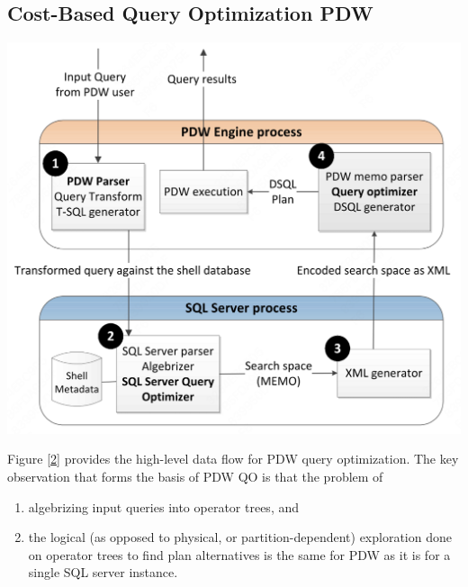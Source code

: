 \documentclass[11pt]{article}
\begin{document}
\subsection{Cost-Based Query Optimization PDW}
\label{sec:org0bf2408}
\begin{center}
\includegraphics[width=.\textwidth]{../../images/papers/185.png}
\label{2}
\end{center}

Figure \ref{2} provides the high-level data flow for PDW query optimization. The key observation that
forms the basis of PDW QO is that the problem of
\begin{enumerate}
\item algebrizing input queries into operator trees, and
\item the logical (as opposed to physical, or partition-dependent) exploration done on operator trees to
find plan alternatives is the same for PDW as it is for a single SQL server instance.
\end{enumerate}
\end{document}
